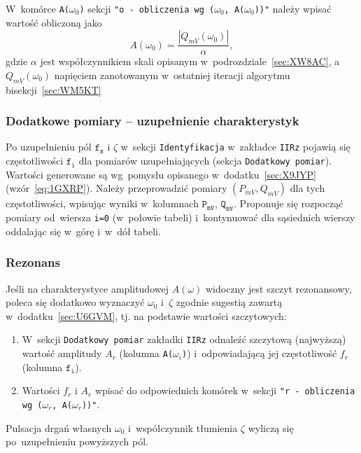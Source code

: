 \documentclass[paper=a4,DIV=12]{lpas}
\begin{document}
W~komórce \texttt{A($\omega_0$)} sekcji \texttt{"o - obliczenia wg ($\omega_0$,
A($\omega_0$))"} należy wpisać wartość obliczoną jako
\begin{equation}
  A(\omega_0) = \frac{|Q_{mV}(\omega_0)|}{\alpha},
  \label{eq:A7ZD6}
\end{equation}
gdzie $\alpha$ jest współczynnikiem skali opisanym
w~podrozdziale~\ref{sec:XW8AC}, a~$Q_{mV}(\omega_0)$ napięciem zanotowanym
w~ostatniej iteracji algorytmu bisekcji~\ref{sec:WM5KT}


\subsubsection{Dodatkowe pomiary -- uzupełnienie charakterystyk}
\label{sec:09H54}

Po uzupełnieniu pól $\texttt{f}_\texttt{s}$ i $\zeta$ w~sekcji
\texttt{Identyfikacja} w~zakładce \texttt{IIRz} pojawią się częstotliwości
$\texttt{f}_\texttt{i}$ dla pomiarów uzupełniających (sekcja \texttt{Dodatkowy
pomiar}). Wartości generowane są wg~pomysłu opisanego w~dodatku~\ref{sec:X9JYP}
(wzór~\eqref{eq:1GXRP}). Należy przeprowadzić pomiary $(P_{mV}, Q_{mV})$ dla
tych częstotliwości, wpisując wyniki w~kolumnach $\texttt{P}_\texttt{mV}$,
$\texttt{Q}_\texttt{mV}$. Proponuje się rozpocząć pomiary od~wiersza
\texttt{i=0} (w~połowie tabeli) i~kontynuować dla sąsiednich wierszy oddalając
się w~górę i~w~dół tabeli.

\subsubsection{Rezonans}
\label{sec:0NZQS}

Jeśli na charakterystyce amplitudowej $A(\omega)$ widoczny jest szczyt
rezonansowy, poleca się dodatkowo wyznaczyć $\omega_0$ i~$\zeta$ zgodnie
sugestią zawartą w~dodatku~\ref{sec:U6GVM}, tj. na podstawie wartości
szczytowych:

\begin{enumerate}
  \item W~sekcji \texttt{Dodatkowy pomiar} zakładki \texttt{IIRz} odnaleźć
    szczytową (najwyższą) wartość amplitudy $A_r$ (kolumna \texttt{A($\omega_i$)})
    i~odpowiadającą jej częstotliwość $f_r$ (kolumna $\texttt{f}_{\texttt{i}}$).
  \item Wartości $f_r$ i $A_r$ wpisać do odpowiednich komórek w~sekcji
    \texttt{"r - obliczenia wg ($\omega_r$, A($\omega_r$))"}.
\end{enumerate}
Pulsacja drgań własnych $\omega_0$ i~współczynnik tłumienia $\zeta$ wyliczą się
po~uzupełnieniu powyższych pól.
\end{document}
